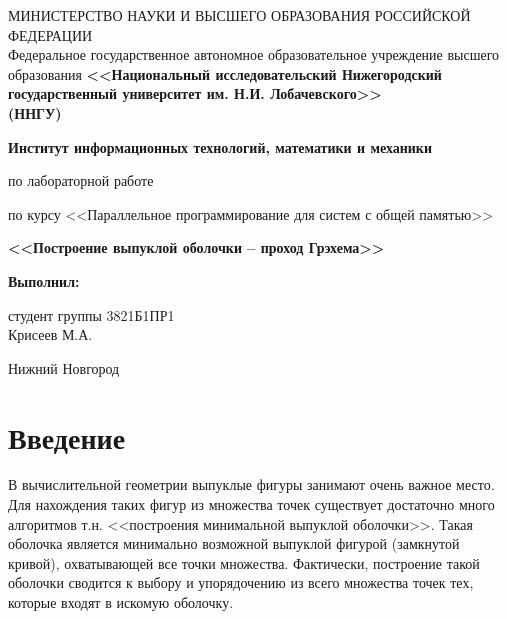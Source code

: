 \documentclass[a4paper,12pt]{article}
\begin{document}
\begin{titlepage}
 \begin{center}
{\small МИНИСТЕРСТВО НАУКИ И ВЫСШЕГО ОБРАЗОВАНИЯ РОССИЙСКОЙ ФЕДЕРАЦИИ\\
 Федеральное государственное автономное образовательное учреждение
высшего образования
}
\textbf{<<Национальный исследовательский
Нижегородский государственный университет им. Н.И. Лобачевского>>\\
(ННГУ)\\}

\vspace*{1cm}

\textbf{Институт информационных технологий, математики и механики}

\vspace*{3cm}

\textbf{}

по лабораторной работе

по курсу <<Параллельное программирование для систем с общей памятью>>

\vspace{1em}

\textbf{\large<<Построение выпуклой оболочки -- проход Грэхема>>}

\end{center}

\vspace{2cm}

\begin{flushright}
\parbox{8.5cm}{
\textbf{Выполнил:}

студент группы 3821Б1ПР1\\
Крисеев М.А.
}
\end{flushright}

\flushbottom

\vfill

\begin{center}
 Нижний Новгород

 \the\year
\end{center}

\end{titlepage}

\tableofcontents

\newpage
\section*{Введение}
\label{sec:intro}

В вычислительной геометрии выпуклые фигуры занимают очень важное место. 
Для нахождения таких фигур из множества точек существует достаточно много алгоритмов
т.н. <<построения минимальной выпуклой оболочки>>. Такая оболочка является минимально возможной
выпуклой фигурой (замкнутой кривой), охватывающей все точки множества. Фактически,
построение такой оболочки сводится к выбору и упорядочению из всего множества точек тех, которые 
входят в искомую оболочку.
\newpage
\end{document}
